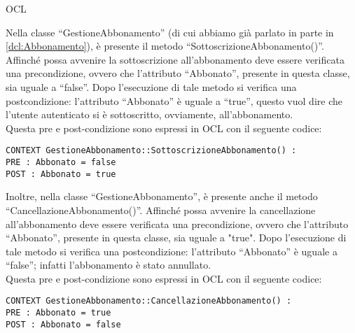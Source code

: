 \begin{listaPersonale}{OCL}
    \begin{center}
        
    \end{center}
    Nella classe “GestioneAbbonamento” (di cui abbiamo già parlato in parte in \ref{dcl:Abbonamento}), è presente il metodo “SottoscrizioneAbbonamento()”. Affinché possa avvenire la sottoscrizione all'abbonamento deve essere verificata una precondizione, ovvero che l'attributo “Abbonato”, presente in questa classe, sia uguale a “false”. Dopo l'esecuzione di tale metodo si verifica una postcondizione: l'attributo “Abbonato” è uguale a “true”, questo vuol dire che l'utente autenticato si è sottoscritto, ovviamente, all'abbonamento.\\
    Questa pre e post-condizione sono espressi in OCL con il seguente codice:
    \begin{lstlisting}
CONTEXT GestioneAbbonamento::SottoscrizioneAbbonamento() :
PRE : Abbonato = false
POST : Abbonato = true
    \end{lstlisting}
    Inoltre, nella classe “GestioneAbbonamento”, è presente anche il metodo “CancellazioneAbbonamento()”. Affinché possa avvenire la cancellazione all'abbonamento deve essere verificata una precondizione, ovvero che l'attributo “Abbonato”, presente in questa classe, sia uguale a "true". Dopo l'esecuzione di tale metodo si verifica una postcondizione: l'attributo “Abbonato” è uguale a “false”; infatti l'abbonamento è stato annullato.\\
    Questa pre e post-condizione sono espressi in OCL con il seguente codice:
    \begin{lstlisting}
CONTEXT GestioneAbbonamento::CancellazioneAbbonamento() :
PRE : Abbonato = true
POST : Abbonato = false
    \end{lstlisting}





\end{listaPersonale}

